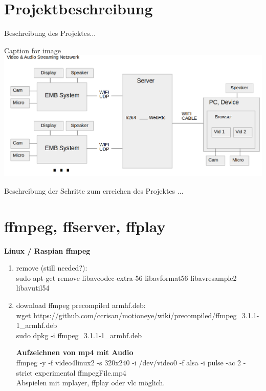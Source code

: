 \section{Projektbeschreibung}

Beschreibung des Projektes...


\begin{minipage}{\textwidth}
    \begin{center}
        Caption for image
        \includegraphics[scale=0.4]{img/schemaproj.png} 
    \end{center}
\end{minipage}


Beschreibung der Schritte zum erreichen des Projektes
...

\section{ffmpeg, ffserver, ffplay}

\textbf{Linux / Raspian ffmpeg} %

\begin{enumerate}
	\item remove (still needed?):\\
	sudo apt-get remove libavcodec-extra-56 libavformat56 libavresample2 libavutil54
	\item download ffmpeg precompiled armhf.deb:\\
	wget https://github.com/ccrisan/motioneye/wiki/precompiled/ffmpeg\_3.1.1-1\_armhf.deb\\
	sudo dpkg -i ffmpeg\_3.1.1-1\_armhf.deb
	
\textbf{Aufzeichnen von mp4 mit Audio}\\
ffmpeg -y -f video4linux2 -s 320x240 -i /dev/video0 -f alsa -i pulse -ac 2 -strict experimental ffmpegFile.mp4\\
Abspielen mit mplayer, ffplay oder vlc möglich.
	
	
\end{enumerate}


